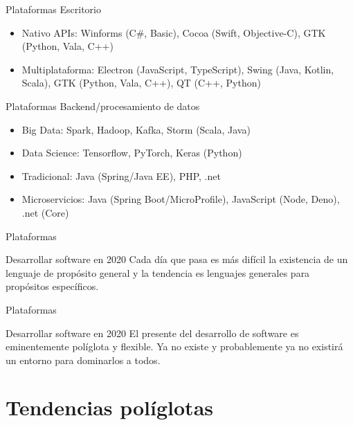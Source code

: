 \documentclass[aspectratio=169]{beamer}
\begin{document}
\begin{frame}{Plataformas}
    Escritorio
	\begin{itemize}
	\item Nativo APIs: Winforms (C\#, Basic), Cocoa (Swift, Objective-C), GTK (Python, Vala, C++)
    \item Multiplataforma: Electron (JavaScript, TypeScript), Swing (Java, Kotlin, Scala), GTK (Python, Vala, C++), QT (C++, Python)
	\end{itemize}
\end{frame}



\begin{frame}{Plataformas}
    Backend/procesamiento de datos
	\begin{itemize}
	\item Big Data: Spark, Hadoop, Kafka, Storm (Scala, Java)
    \item Data Science: Tensorflow, PyTorch, Keras (Python)
    \item Tradicional: Java (Spring/Java EE), PHP, .net
    \item Microservicios: Java (Spring Boot/MicroProfile), JavaScript (Node, Deno), .net (Core)

	\end{itemize}
\end{frame}

\begin{frame}{Plataformas}

	\begin{alertblock}{Desarrollar software en 2020}
    Cada día que pasa es más difícil la existencia de un lenguaje de propósito general y la tendencia es lenguajes generales para propósitos específicos.
	\end{alertblock}
\end{frame}

\begin{frame}{Plataformas}

	\begin{alertblock}{Desarrollar software en 2020}
    El presente del desarrollo de software es eminentemente políglota y flexible. Ya no existe y probablemente ya no existirá un entorno para dominarlos a todos.
	\end{alertblock}
\end{frame}

\section{Tendencias políglotas}
\end{document}
